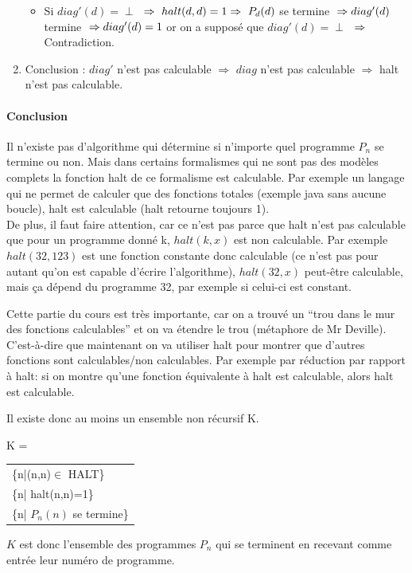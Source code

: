 \begin{enumerate}
\begin{itemize}
			\item Si $diag'(d)= \perp$ $\\
			\Rightarrow \  halt(d,d) = 1 \\
			\Rightarrow \ P_d(d)$ se termine $ \\
			\Rightarrow diag'(d)$ termine $ \\
			\Rightarrow diag'(d) = 1$ or on a supposé que $diag'(d) = \perp$ $ \\
			\Rightarrow $
			Contradiction.
		\end{itemize}
	\item Conclusion : $diag'$ n'est pas calculable $ \Rightarrow $ $diag$
	n'est pas calculable $ \Rightarrow $ halt n'est pas calculable.

\end{enumerate}

\paragraph{Conclusion} Il n'existe pas d'algorithme qui détermine si n'importe quel programme $P_n$ se termine ou non. Mais dans certains formalismes qui ne sont pas des modèles complets la fonction halt de ce formalisme est calculable.
Par exemple un langage qui ne permet de calculer
que des fonctions totales (exemple java sans aucune boucle), halt est calculable (halt retourne toujours 1). \\

De plus, il faut faire attention, car ce n'est pas parce que halt n'est pas calculable que pour un programme donné k, $halt(k,x)$ est non calculable. Par exemple $halt(32,123)$ est une fonction constante donc calculable (ce n'est pas pour autant qu'on est capable d'écrire l'algorithme), $halt(32,x)$ peut-être calculable, mais ça dépend du programme 32, par exemple si celui-ci est constant.

\begin{myrem}
	Cette partie du cours est très importante, car on a trouvé un ``trou dans le mur des fonctions calculables'' et on va étendre le trou (métaphore
	de Mr Deville). C'est-à-dire que maintenant on va utiliser halt pour montrer que d'autres fonctions sont calculables/non calculables. Par exemple	par réduction par rapport à halt: si on montre qu'une fonction équivalente à halt est calculable, alors halt est calculable.
\end{myrem}

Il existe donc au moins un ensemble non récursif
K.

\begin{mydef}[K]
	K =
	\begin{tabular}{l}
		\{n|(n,n)$\in$ HALT\}\\
		\{n| halt(n,n)=1\}\\
		\{n| $P_n(n)$ se termine\}
	\end{tabular}
	$K$ est donc l'ensemble des programmes $P_n$ qui se terminent en recevant comme entrée leur numéro de programme.
\end{mydef}


